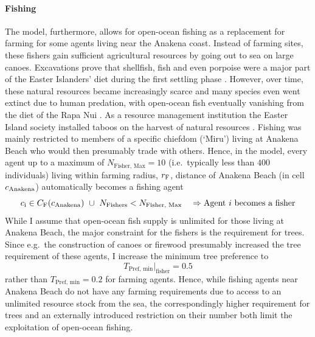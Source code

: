 \paragraph{Fishing}
The model, furthermore, allows for open-ocean fishing as a replacement for farming for some agents living near the Anakena coast.
Instead of farming sites, these fishers gain sufficient agricultural resources by going out to sea on large canoes.
Excavations prove that shellfish, fish and even porpoise were a major part of the Easter Islanders' diet during the first settling phase \citep{Bahn2017}.
However, over time, these natural resources became increasingly scarce and many species even went extinct due to human predation, with open-ocean fish eventually vanishing from the diet of the Rapa Nui \citep{Diamond2011}.
As a resource management institution the Easter Island society installed taboos on the harvest of natural resources \citep{Good2006}. 
Fishing was mainly restricted to members of a specific chiefdom (`Miru') living at Anakena Beach \citep{Bahn2017} who would then presumably trade with others.
Hence, in the model, every agent up to a maximum of $N_\text{Fisher, Max} = 10$ (i.e.\ typically less than $400$ individuals) living within farming radius, $r_{\rm F}$, distance of Anakena Beach (in cell $c_{\rm Anakena}$) automatically becomes a fishing agent
\begin{equation}
 	c_{\rm i} \in C_{\rm F}(c_{\rm Anakena}) \  \cup \ N_\text{Fishers}<N_\text{Fisher, Max} \quad \Rightarrow \text{Agent }i\text{ becomes a fisher}
\end{equation}
While I assume that open-ocean fish supply is unlimited for those living at Anakena Beach, the major constraint for the fishers is the requirement for trees.
Since e.g.\ the construction of canoes or firewood presumably increased the tree requirement of these agents, I increase the minimum tree preference to
\begin{equation}
T_\text{Pref, min}|_\text{fisher} = 0.5
\end{equation} 
rather than $T_\text{Pref, min} = 0.2$ for farming agents.
Hence, while fishing agents near Anakena Beach do not have any farming requirements due to access to an unlimited resource stock from the sea, the correspondingly higher requirement for trees and an externally introduced restriction on their number both limit the exploitation of open-ocean fishing.

